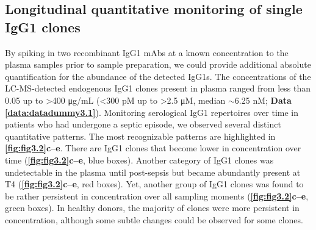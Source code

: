 \subsection{Longitudinal quantitative monitoring of single IgG1 clones}
By spiking in two recombinant IgG1 mAbs at a known concentration to the plasma samples prior to sample preparation, we could provide additional absolute quantification for the abundance of the detected IgG1s. The concentrations of the LC-MS-detected endogenous IgG1 clones present in plasma ranged from less than 0.05 up to >400 μg/mL (<300 pM up to >2.5 μM, median $\sim$6.25 nM; \textbf{Data \ref{data:datadummy3.1}}). Monitoring serological IgG1 repertoires over time in patients who had undergone a septic episode, we observed several distinct quantitative patterns. The most recognizable patterns are highlighted in \textbf{\autoref{fig:fig3.2}c–e}. There are IgG1 clones that become lower in concentration over time (\textbf{\autoref{fig:fig3.2}c–e}, blue boxes). Another category of IgG1 clones was undetectable in the plasma until post-sepsis but became abundantly present at T4 (\textbf{\autoref{fig:fig3.2}c–e}, red boxes). Yet, another group of IgG1 clones was found to be rather persistent in concentration over all sampling moments (\textbf{\autoref{fig:fig3.2}c–e}, green boxes). In healthy donors, the majority of clones were more persistent in concentration, although some subtle changes could be observed for some clones.

